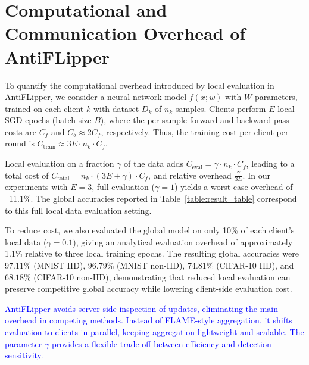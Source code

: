 \documentclass[conference]{IEEEtran}
\begin{document}
\section{Computational and Communication Overhead of AntiFLipper}
\label{sec:overhead}

To quantify the computational overhead introduced by local evaluation in {AntiFLipper}, we consider a neural network model $f(x; w)$ with $W$ parameters, trained on each client $k$ with dataset $D_k$ of $n_k$ samples. Clients perform $E$ local SGD epochs (batch size $B$), where the per-sample forward and backward pass costs are $C_f$ and $C_b \approx 2C_f$, respectively. Thus, the training cost per client per round is $C_{\text{train}} \approx 3E \cdot n_k \cdot C_f$.

Local evaluation on a fraction $\gamma$ of the data adds $C_{\text{eval}} = \gamma \cdot n_k \cdot C_f$, leading to a total cost of $C_{\text{total}} = n_k \cdot (3E + \gamma) \cdot C_f$, and relative overhead $\frac{\gamma}{3E}$. In our experiments with $E = 3$, full evaluation ($\gamma = 1$) yields a worst-case overhead of ~11.1\%. The global accuracies reported in Table~\ref{table:result_table} correspond to this full local data evaluation setting.

To reduce cost, we also evaluated the global model on only 10\% of each client's local data ($\gamma = 0.1$), giving an analytical evaluation overhead of approximately 1.1\% relative to three local training epochs. The resulting global accuracies were $97.11\%$ (MNIST IID), $96.79\%$ (MNIST non-IID), $74.81\%$ (CIFAR-10 IID), and $68.18\%$ (CIFAR-10 non-IID), demonstrating that reduced local evaluation can preserve competitive global accuracy while lowering client-side evaluation cost.

\textcolor{blue}{AntiFLipper avoids server-side inspection of updates, eliminating the main overhead in competing methods. Instead of FLAME-style aggregation, it shifts evaluation to clients in parallel, keeping aggregation lightweight and scalable. The parameter $\gamma$ provides a flexible trade-off between efficiency and detection sensitivity.}
\end{document}
